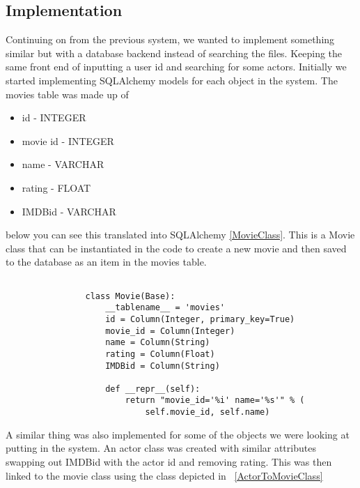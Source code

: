         \subsection{Implementation}
            Continuing on from the previous system, we wanted to implement something similar but with a database backend instead of searching the files. Keeping the same front end of inputting a user id and searching for some actors. Initially we started implementing SQLAlchemy models for each object in the system. The movies table was made up of 
            
            \begin{itemize}
                \item id       - INTEGER
                \item movie id - INTEGER
                \item name     - VARCHAR
                \item rating   - FLOAT
                \item IMDBid   - VARCHAR
            \end{itemize} 
            below you can see this translated into SQLAlchemy \ref{MovieClass}. This is a Movie class that can be instantiated in the code to create a new movie and then saved to the database as an item in the movies table. 
            

            \begin{lstlisting}[gobble=16, tabsize=4,caption=Representing the movie class,label=MovieClass]

                class Movie(Base):
                    __tablename__ = 'movies'
                    id = Column(Integer, primary_key=True)
                    movie_id = Column(Integer)
                    name = Column(String)
                    rating = Column(Float)
                    IMDBid = Column(String)

                    def __repr__(self):
                        return "movie_id='%i' name='%s'" % (
                            self.movie_id, self.name)
            \end{lstlisting}

            A similar thing was also implemented for some of the objects we were looking at putting in the system. An actor class was created with similar attributes swapping out IMDBid with the actor id and removing rating. This was then linked to the movie class using the class depicted in ~\ref{ActorToMovieClass}


